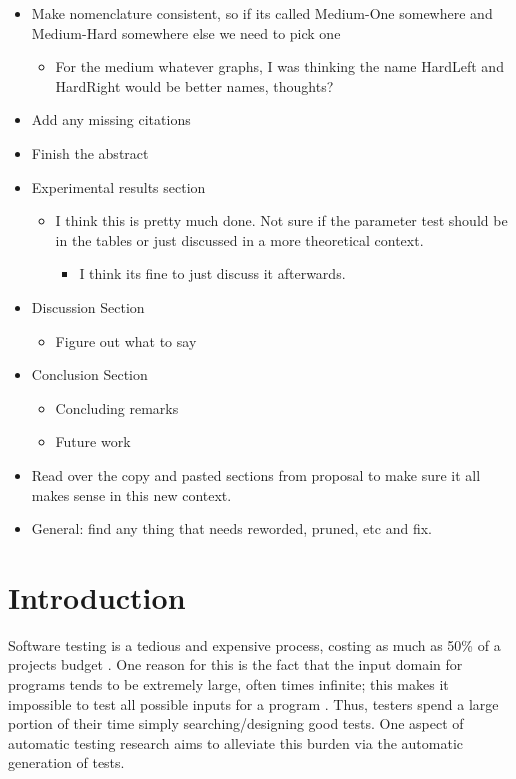 \documentclass[runningheads]{llncs}
\begin{document}
\begin{itemize}
\item Make nomenclature consistent, so if its called Medium-One somewhere and Medium-Hard somewhere else we need to pick one
     \begin{itemize}
     \item For the medium whatever graphs, I was thinking the name HardLeft and HardRight would be better names, thoughts?
     \end{itemize}
\item Add any missing citations
\item Finish the abstract
\item Experimental results section
     \begin{itemize}
     \item I think this is pretty much done. Not sure if the parameter test should be in the tables
	     or just discussed in a more theoretical context.
	     \begin{itemize}
          \item I think its fine to just discuss it afterwards.
         \end{itemize}
     \end{itemize}
\item Discussion Section
     \begin{itemize}
     \item Figure out what to say
     \end{itemize}
\item Conclusion Section
     \begin{itemize}
     \item Concluding remarks
     \item Future work
     \end{itemize}
\item Read over the copy and pasted sections from proposal to make sure it all makes sense in this new context.
\item General: find any thing that needs reworded, pruned, etc and fix.
\end{itemize}


\section{Introduction}
Software testing is a tedious and expensive process, costing as much as 50\% of a projects budget \cite{meyers1}. One reason for this is the fact that the input domain for programs tends to be extremely large, often times infinite; this makes it impossible to test all possible inputs for a program \cite{meyers1}. Thus, testers spend a large portion of their time simply searching/designing good tests. One aspect of automatic testing research aims to alleviate this burden via the automatic generation of tests.
\end{document}
